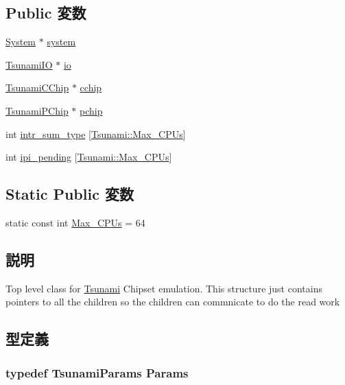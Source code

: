 \subsection*{Public 変数}
\begin{DoxyCompactItemize}
\item 
\hyperlink{classSystem}{System} $\ast$ \hyperlink{classTsunami_af27ccd765f13a4b7bd119dc7579e2746}{system}
\item 
\hyperlink{classTsunami_1_1TsunamiIO}{TsunamiIO} $\ast$ \hyperlink{classTsunami_a9d42ea935a6d6bddb63076040468dfe4}{io}
\item 
\hyperlink{classTsunami_1_1TsunamiCChip}{TsunamiCChip} $\ast$ \hyperlink{classTsunami_afd150142ed1f45226be23c3dfc00fa79}{cchip}
\item 
\hyperlink{classTsunami_1_1TsunamiPChip}{TsunamiPChip} $\ast$ \hyperlink{classTsunami_aff5dc15395b4de17c7cefb01a627f822}{pchip}
\item 
int \hyperlink{classTsunami_a10691edeecd1b6fe8a38b465bdf4c41d}{intr\_\-sum\_\-type} \mbox{[}\hyperlink{classTsunami_ab15ce4af0fe2c47746a30bafa34ced51}{Tsunami::Max\_\-CPUs}\mbox{]}
\item 
int \hyperlink{classTsunami_ae3bd11c65a338e493ad9b0df87a6b34c}{ipi\_\-pending} \mbox{[}\hyperlink{classTsunami_ab15ce4af0fe2c47746a30bafa34ced51}{Tsunami::Max\_\-CPUs}\mbox{]}
\end{DoxyCompactItemize}
\subsection*{Static Public 変数}
\begin{DoxyCompactItemize}
\item 
static const int \hyperlink{classTsunami_ab15ce4af0fe2c47746a30bafa34ced51}{Max\_\-CPUs} = 64
\end{DoxyCompactItemize}


\subsection{説明}
Top level class for \hyperlink{classTsunami}{Tsunami} Chipset emulation. This structure just contains pointers to all the children so the children can commnicate to do the read work 

\subsection{型定義}
\hypertarget{classTsunami_a7beeeed12982def83e22faf17f7385e1}{
\subsubsection[{Params}]{\setlength{\rightskip}{0pt plus 5cm}typedef TsunamiParams {\bf Params}}}
\label{classTsunami_a7beeeed12982def83e22faf17f7385e1}


